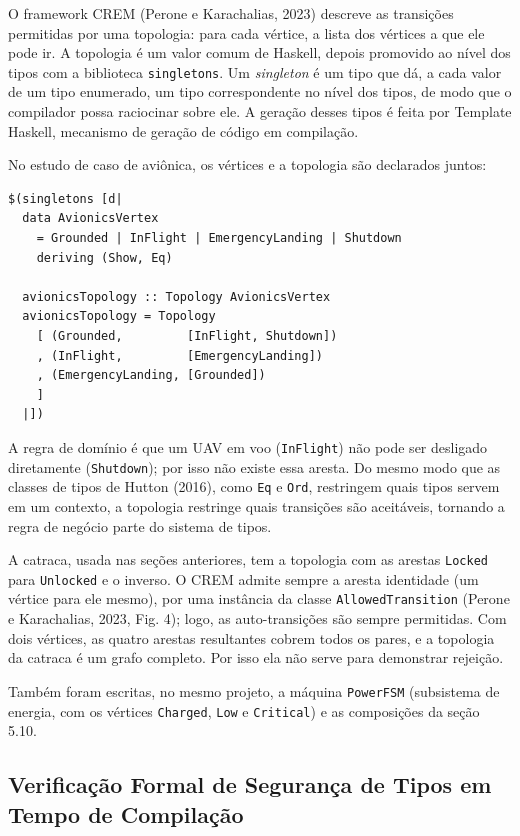 \documentclass[12pt,a4paper]{article}
\begin{document}
O framework CREM (Perone e Karachalias, 2023) descreve as transições permitidas por uma topologia: para cada vértice, a lista dos vértices a que ele pode ir. A topologia é um valor comum de Haskell, depois promovido ao nível dos tipos com a biblioteca \texttt{singletons}. Um \textit{singleton} é um tipo que dá, a cada valor de um tipo enumerado, um tipo correspondente no nível dos tipos, de modo que o compilador possa raciocinar sobre ele. A geração desses tipos é feita por Template Haskell, mecanismo de geração de código em compilação.

No estudo de caso de aviônica, os vértices e a topologia são declarados juntos:

\begin{verbatim}
$(singletons [d|
  data AvionicsVertex
    = Grounded | InFlight | EmergencyLanding | Shutdown
    deriving (Show, Eq)

  avionicsTopology :: Topology AvionicsVertex
  avionicsTopology = Topology
    [ (Grounded,         [InFlight, Shutdown])
    , (InFlight,         [EmergencyLanding])
    , (EmergencyLanding, [Grounded])
    ]
  |])
\end{verbatim}

A regra de domínio é que um UAV em voo (\texttt{InFlight}) não pode ser desligado diretamente (\texttt{Shutdown}); por isso não existe essa aresta. Do mesmo modo que as classes de tipos de Hutton (2016), como \texttt{Eq} e \texttt{Ord}, restringem quais tipos servem em um contexto, a topologia restringe quais transições são aceitáveis, tornando a regra de negócio parte do sistema de tipos.

A catraca, usada nas seções anteriores, tem a topologia com as arestas \texttt{Locked} para \texttt{Unlocked} e o inverso. O CREM admite sempre a aresta identidade (um vértice para ele mesmo), por uma instância da classe \texttt{AllowedTransition} (Perone e Karachalias, 2023, Fig. 4); logo, as auto-transições são sempre permitidas. Com dois vértices, as quatro arestas resultantes cobrem todos os pares, e a topologia da catraca é um grafo completo. Por isso ela não serve para demonstrar rejeição.

Também foram escritas, no mesmo projeto, a máquina \texttt{PowerFSM} (subsistema de energia, com os vértices \texttt{Charged}, \texttt{Low} e \texttt{Critical}) e as composições da seção 5.10.

\subsection{Verificação Formal de Segurança de Tipos em Tempo de Compilação}
\end{document}

